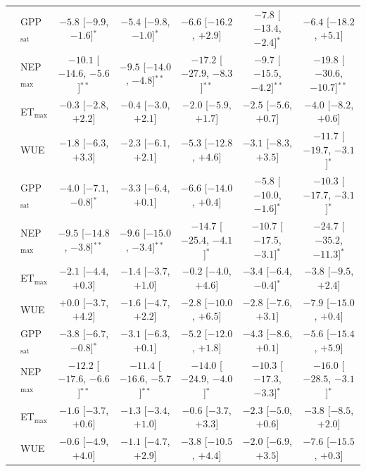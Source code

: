 \begin{table}[p]
{\begin{tabular}{llccccc}
\midrule
{} & GPP$_\mathrm{sat}$ & $-5.8$ {\tiny[$-9.9$, $-1.6$]}$^{*}$ & $-5.4$ {\tiny[$-9.8$, $-1.0$]}$^{*}$ & $-6.6$ {\tiny[$-16.2$, $+2.9$]} & $-7.8$ {\tiny[$-13.4$, $-2.4$]}$^{*}$ & $-6.4$ {\tiny[$-18.2$, $+5.1$]} \\
 & NEP$_\mathrm{max}$ & $-10.1$ {\tiny[$-14.6$, $-5.6$]}$^{**}$ & $-9.5$ {\tiny[$-14.0$, $-4.8$]}$^{**}$ & $-17.2$ {\tiny[$-27.9$, $-8.3$]}$^{**}$ & $-9.7$ {\tiny[$-15.5$, $-4.2$]}$^{**}$ & $-19.8$ {\tiny[$-30.6$, $-10.7$]}$^{**}$ \\
 & ET$_\mathrm{max}$ & $-0.3$ {\tiny[$-2.8$, $+2.2$]} & $-0.4$ {\tiny[$-3.0$, $+2.1$]} & $-2.0$ {\tiny[$-5.9$, $+1.7$]} & $-2.5$ {\tiny[$-5.6$, $+0.7$]} & $-4.0$ {\tiny[$-8.2$, $+0.6$]} \\
 & WUE & $-1.8$ {\tiny[$-6.3$, $+3.3$]} & $-2.3$ {\tiny[$-6.1$, $+2.1$]} & $-5.3$ {\tiny[$-12.8$, $+4.6$]} & $-3.1$ {\tiny[$-8.3$, $+3.5$]} & $-11.7$ {\tiny[$-19.7$, $-3.1$]}$^{*}$ \\
\midrule
{} & GPP$_\mathrm{sat}$ & $-4.0$ {\tiny[$-7.1$, $-0.8$]}$^{*}$ & $-3.3$ {\tiny[$-6.4$, $+0.1$]} & $-6.6$ {\tiny[$-14.0$, $+0.4$]} & $-5.8$ {\tiny[$-10.0$, $-1.6$]}$^{*}$ & $-10.3$ {\tiny[$-17.7$, $-3.1$]}$^{*}$ \\
 & NEP$_\mathrm{max}$ & $-9.5$ {\tiny[$-14.8$, $-3.8$]}$^{**}$ & $-9.6$ {\tiny[$-15.0$, $-3.4$]}$^{**}$ & $-14.7$ {\tiny[$-25.4$, $-4.1$]}$^{*}$ & $-10.7$ {\tiny[$-17.5$, $-3.1$]}$^{*}$ & $-24.7$ {\tiny[$-35.2$, $-11.3$]}$^{*}$ \\
 & ET$_\mathrm{max}$ & $-2.1$ {\tiny[$-4.4$, $+0.3$]} & $-1.4$ {\tiny[$-3.7$, $+1.0$]} & $-0.2$ {\tiny[$-4.0$, $+4.6$]} & $-3.4$ {\tiny[$-6.4$, $-0.4$]}$^{*}$ & $-3.8$ {\tiny[$-9.5$, $+2.4$]} \\
 & WUE & $+0.0$ {\tiny[$-3.7$, $+4.2$]} & $-1.6$ {\tiny[$-4.7$, $+2.2$]} & $-2.8$ {\tiny[$-10.0$, $+6.5$]} & $-2.8$ {\tiny[$-7.6$, $+3.1$]} & $-7.9$ {\tiny[$-15.0$, $+0.4$]} \\
\midrule
{} & GPP$_\mathrm{sat}$ & $-3.8$ {\tiny[$-6.7$, $-0.8$]}$^{*}$ & $-3.1$ {\tiny[$-6.3$, $+0.1$]} & $-5.2$ {\tiny[$-12.0$, $+1.8$]} & $-4.3$ {\tiny[$-8.6$, $+0.1$]} & $-5.6$ {\tiny[$-15.4$, $+5.9$]} \\
 & NEP$_\mathrm{max}$ & $-12.2$ {\tiny[$-17.6$, $-6.6$]}$^{**}$ & $-11.4$ {\tiny[$-16.6$, $-5.7$]}$^{**}$ & $-14.0$ {\tiny[$-24.9$, $-4.0$]}$^{*}$ & $-10.3$ {\tiny[$-17.3$, $-3.3$]}$^{*}$ & $-16.0$ {\tiny[$-28.5$, $-3.1$]}$^{*}$ \\
 & ET$_\mathrm{max}$ & $-1.6$ {\tiny[$-3.7$, $+0.6$]} & $-1.3$ {\tiny[$-3.4$, $+1.0$]} & $-0.6$ {\tiny[$-3.7$, $+3.3$]} & $-2.3$ {\tiny[$-5.0$, $+0.6$]} & $-3.8$ {\tiny[$-8.5$, $+2.0$]} \\
 & WUE & $-0.6$ {\tiny[$-4.9$, $+4.0$]} & $-1.1$ {\tiny[$-4.7$, $+2.9$]} & $-3.8$ {\tiny[$-10.5$, $+4.4$]} & $-2.0$ {\tiny[$-6.9$, $+3.5$]} & $-7.6$ {\tiny[$-15.5$, $+0.3$]} \\
\bottomrule
\end{tabular}}
\end{table}
